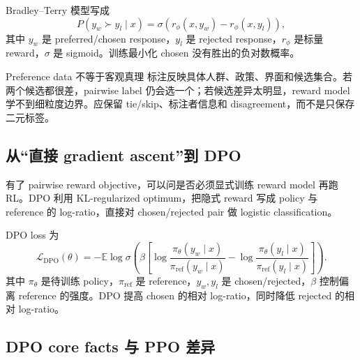
Bradley--Terry 模型写成
\[
P(y_w\succ y_l\mid x)=\sigma\!\left(r_{\phi}(x,y_w)-r_{\phi}(x,y_l)\right),
\]
其中 $y_w$ 是 preferred/chosen response，$y_l$ 是 rejected response，$r_{\phi}$ 是标量 reward，$\sigma$ 是 sigmoid。训练最小化 chosen 没有胜出的负对数概率。

\begin{warningbox}{Preference data 不等于客观真理}
标注反映具体人群、政策、界面和候选集合。若两个候选都很差，pairwise label 仍会选一个；若候选差异太明显，reward model 学不到细粒度边界。应保留 tie/skip、标注者信息和 disagreement，而不是只保存二元标签。
\end{warningbox}


\subsection{从“直接 gradient ascent”到 DPO}

有了 pairwise reward objective，可以问是否必须显式训练 reward model 再跑 RL。DPO 利用 KL-regularized optimum，把隐式 reward 写成 policy 与 reference 的 log-ratio，直接对 chosen/rejected pair 做 logistic classification。



DPO loss 为
\[
\mathcal{L}_{\mathrm{DPO}}(\theta)=-\mathbb{E}\log\sigma\!\left(
\beta\left[
\log\frac{\pi_{\theta}(y_w\mid x)}{\pi_{\mathrm{ref}}(y_w\mid x)}-
\log\frac{\pi_{\theta}(y_l\mid x)}{\pi_{\mathrm{ref}}(y_l\mid x)}
\right]\right).
\]
其中 $\pi_{\theta}$ 是待训练 policy，$\pi_{\mathrm{ref}}$ 是 reference，$y_w,y_l$ 是 chosen/rejected，$\beta$ 控制偏离 reference 的强度。DPO 提高 chosen 的相对 log-ratio，同时降低 rejected 的相对 log-ratio。


\subsection{DPO core facts 与 PPO 差异}

